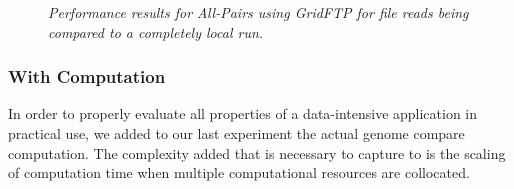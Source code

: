 \documentclass{rspublic}
\begin{document}
\begin{center}
\begin{figure}[ht]
\caption{\textit{Performance results for All-Pairs using GridFTP for
file reads being compared to a completely local run.}}
\label{Fig:ExpIConventionalLocal}
\end{figure}
\end{center}

\subsubsection{With Computation} 
In order to properly evaluate all properties of a data-intensive
application in practical use, we added to our last experiment the actual genome
compare computation. The complexity added that is necessary to capture to is
the scaling of computation time when multiple computational resources are
collocated.
\end{document}
